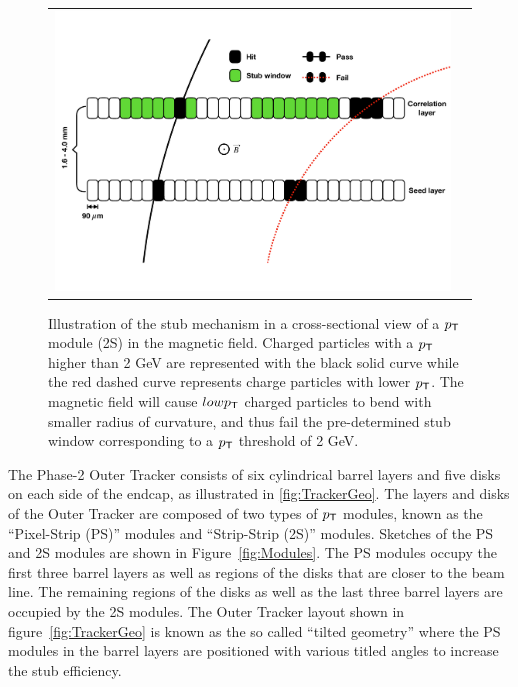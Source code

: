 \begin{figure}[tbh!]
 \begin{center}
  \begin{tabular}{cc}
   \centering\includegraphics[width=0.9\linewidth]{figures/Part2/Upgrade/Stub}
  \end{tabular}
  \caption{Illustration of the stub mechanism in a cross-sectional view of a $p_{\textsf{T}}$ module (2S) in the magnetic field. Charged particles with a $p_{\textsf{T}}$ higher than 2 GeV are represented with the black solid curve while the red dashed curve represents charge particles with lower $p_{\textsf{T}}$. The magnetic field will cause $low p_{\textsf{T}}$ charged particles to bend with smaller radius of curvature, and thus fail the pre-determined stub window corresponding to a $p_{\textsf{T}}$ threshold of 2 GeV.}
 \label{fig:Stub}
 \end{center}
\end{figure}

The Phase-2 Outer Tracker consists of six cylindrical barrel layers and five disks on each side of the endcap, as illustrated in \ref{fig:TrackerGeo}. The layers and disks of the Outer Tracker are composed of two types of $p_{\textsf{T}}$ modules, known as the ``Pixel-Strip (PS)'' modules and ``Strip-Strip (2S)'' modules. Sketches of the PS and 2S modules are shown in Figure~\ref{fig:Modules}. The PS modules occupy the first three barrel layers as well as regions of the disks that are closer to the beam line. The remaining regions of the disks as well as the last three barrel layers are occupied by the 2S modules. The Outer Tracker layout shown in figure~\ref{fig:TrackerGeo} is known as the so called ``tilted geometry'' where the PS modules in the barrel layers are positioned with various titled angles to increase the stub efficiency.

